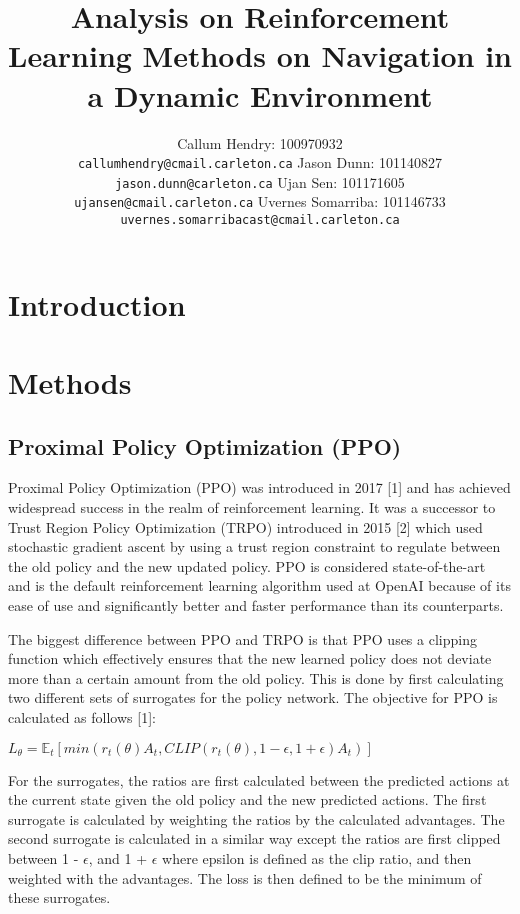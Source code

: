 \documentclass{article}
\title{Analysis on Reinforcement Learning Methods on Navigation in a Dynamic Environment}
\author{
Callum Hendry: 100970932\\
\texttt{callumhendry@cmail.carleton.ca}
\And
Jason Dunn: 101140827\\
\texttt{jason.dunn@carleton.ca}
\And
Ujan Sen: 101171605\\
\texttt{ujansen@cmail.carleton.ca}
\And
Uvernes Somarriba: 101146733\\
\texttt{uvernes.somarribacast@cmail.carleton.ca}
}
\begin{document}
\maketitle

\section{Introduction}

\section{Methods}
\subsection{Proximal Policy Optimization (PPO)}
\label{ppo}

Proximal Policy Optimization (PPO) was introduced in 2017 [1] and has achieved widespread success in the realm of reinforcement learning. It was a successor to Trust Region Policy Optimization (TRPO) introduced in 2015 [2] which used stochastic gradient ascent by using a trust region constraint to regulate between the old policy and the new updated policy. PPO is considered state-of-the-art and is the default reinforcement learning algorithm used at OpenAI because of its ease of use and significantly better and faster performance than its counterparts. 

The biggest difference between PPO and TRPO is that PPO uses a clipping function which effectively ensures that the new learned policy does not deviate more than a certain amount from the old policy. This is done by first calculating two different sets of surrogates for the policy network. The objective for PPO is calculated as follows [1]:

\begin{center}
$L_{\theta} = \mathbb{E}_{t}[min(r_{t}({\theta})A_{t}, CLIP(r_{t}({\theta}), 1-\epsilon, 1+\epsilon)A_{t})]$
\end{center}

For the surrogates, the ratios are first calculated between the predicted actions at the current state given the old policy and the new predicted actions. The first surrogate is calculated by weighting the ratios by the calculated advantages. The second surrogate is calculated in a similar way except the ratios are first clipped between 1 - $\epsilon$, and 1 + $\epsilon$ where epsilon is defined as the clip ratio, and then weighted with the advantages. The loss is then defined to be the minimum of these surrogates.
\end{document}
